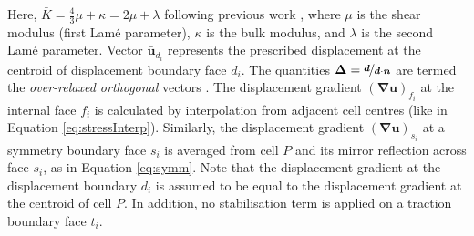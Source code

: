 \documentclass[sn-mathphys,Numbered]{sn-jnl}%
\newcommand{\bb}{\boldsymbol}
\begin{document}
Here, $\bar{K} = \frac{4}{3}\mu + \kappa = 2\mu + \lambda$ following previous work \cite{Jasak2000, Cardiff2017, Cardiff2018}, where $\mu$ is the shear modulus (first Lam\'{e} parameter), $\kappa$ is the bulk modulus, and $\lambda$ is the second Lam\'{e} parameter.
Vector $\bar{\bb{u}}_{d_i}$ represents the prescribed displacement at the centroid of displacement boundary face $d_i$.
The quantities $\bb{\Delta} = \nicefrac{\bb{d}}{\bb{d} \cdot \bb{n}}$ are termed the \emph{over-relaxed orthogonal} vectors \cite{Jasak1996}.
The displacement gradient $\left(\bb{\nabla} \bb{u} \right)_{f_i}$ at the internal face $f_i$ is calculated by interpolation from adjacent cell centres (like in Equation \ref{eq:stressInterp}).
Similarly, the displacement gradient $\left(\bb{\nabla} \bb{u} \right)_{s_i}$ at a symmetry boundary face $s_i$ is averaged from cell $P$ and its mirror reflection across face $s_i$, as in Equation \ref{eq:symm}.
Note that the displacement gradient at the displacement boundary $d_i$ is assumed to be equal to the displacement gradient at the centroid of cell $P$.
In addition, no stabilisation term is applied on a traction boundary face $t_i$.
\end{document}

